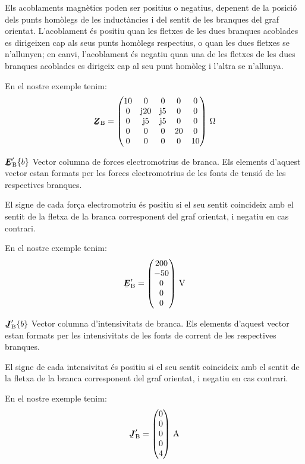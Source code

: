 \begin{list}{}
   Els acoblaments magnètics poden ser positius o negatius, depenent
    de la posició dels punts homòlegs de les inductàncies i del sentit
    de les branques del graf orientat. L'acoblament és positiu quan les
    fletxes de les dues branques acoblades es dirigeixen cap als seus punts
    homòlegs respectius, o quan les dues fletxes se n'allunyen; en canvi,
    l'acoblament és negatiu quan una de les fletxes de les dues branques
    acoblades es dirigeix cap al seu punt homòleg i l'altra se n'allunya.

   En el nostre exemple tenim:
   \[
      \mcmplx{Z}\ped{B} = \begin{pmatrix}
            10 & 0 & 0 & 0 & 0 \\
            0 & \ju 20 & \ju 5 & 0 & 0 \\
            0 & \ju 5 & \ju 5 & 0 & 0 \\
            0 & 0 & 0 & 20 & 0 \\
            0 & 0 & 0 & 0 & 10
      \end{pmatrix}\si{\,\ohm}
   \]

   \item[$\mcmplx{E}'\ped{B}\{b\}$] Vector columna de forces electromotrius de branca. Els elements d'aquest vector estan formats per les forces electromotrius de les fonts de tensió de les respectives branques.

El signe de cada força electromotriu és positiu si el seu sentit coincideix amb el sentit de la fletxa de la branca corresponent del graf orientat, i negatiu en cas contrari.

   En el nostre exemple tenim:
   \[
      \mcmplx{E}'\ped{B} = \begin{pmatrix} 200 \\ -50 \\ 0 \\ 0 \\ 0 \end{pmatrix}\si{\,V}
   \]

   \item[$\mcmplx{J}'\ped{B}\{b\}$] Vector columna d'intensivitats de branca. Els elements d'aquest vector estan formats per les intensivitats de les fonts de corrent de les respectives branques.

El signe de cada intensivitat és positiu si el seu sentit coincideix amb el sentit de la fletxa de la branca corresponent del graf orientat, i negatiu en cas contrari.

   En el nostre exemple tenim:
   \[
      \mcmplx{J}'\ped{B} = \begin{pmatrix} 0 \\ 0 \\ 0 \\ 0 \\ 4 \end{pmatrix}\si{\,A}
   \]

\end{list}

